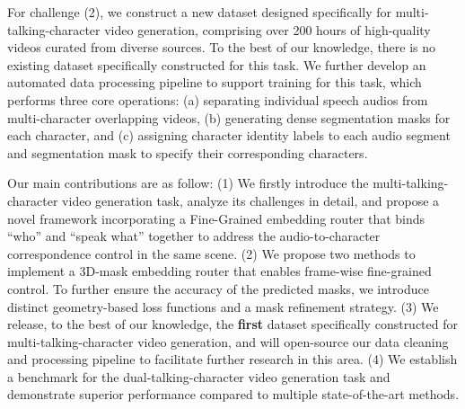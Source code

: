 For challenge (2), we construct a new dataset  designed specifically for multi-talking-character video generation, comprising over 200 hours of high-quality videos curated from diverse sources. 
To the best of our knowledge, there is no existing dataset specifically constructed for this task.
We further develop an automated data processing pipeline to support training for this task, which performs three core operations: (a) separating individual speech audios from multi-character overlapping videos, (b) generating dense segmentation masks for each character, and (c) assigning character identity labels to each audio segment and segmentation mask to specify their corresponding characters.

Our main contributions are as follow: (1) We firstly introduce the multi-talking-character video generation task, analyze its challenges in detail, and propose a novel framework incorporating a Fine-Grained embedding router that binds ``who'' and ``speak what'' together to address the audio-to-character correspondence control in the same scene. 
(2) We propose two methods to implement a 3D-mask embedding router that enables frame-wise fine-grained control. To further ensure the accuracy of the predicted masks, we introduce distinct geometry-based loss functions and a mask refinement strategy.
(3) We release, to the best of our knowledge, the \textbf{first} dataset specifically constructed for multi-talking-character video generation, and will open-source our data cleaning and processing pipeline to facilitate further research in this area.
(4) We establish a benchmark for the dual-talking-character video generation task and demonstrate superior performance compared to multiple state-of-the-art methods.